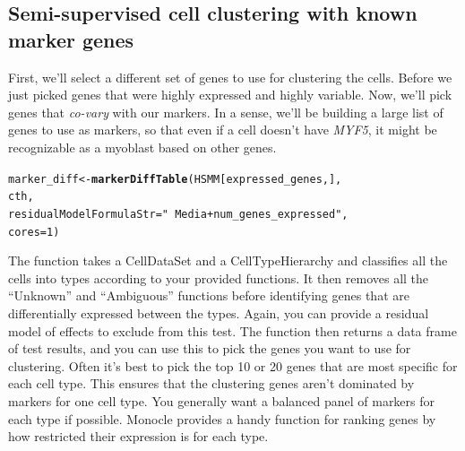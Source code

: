 \documentclass[10pt,oneside]{article}\usepackage[]{graphicx}\usepackage[]{color}
\makeatletter
\newcommand{\hlnum}[1]{\textcolor[rgb]{0.686,0.059,0.569}{#1}}%
\newcommand{\hlstr}[1]{\textcolor[rgb]{0.192,0.494,0.8}{#1}}%
\newcommand{\hlstd}[1]{\textcolor[rgb]{0.345,0.345,0.345}{#1}}%
\newcommand{\hlkwb}[1]{\textcolor[rgb]{0.69,0.353,0.396}{#1}}%
\newcommand{\hlkwc}[1]{\textcolor[rgb]{0.333,0.667,0.333}{#1}}%
\newcommand{\hlkwd}[1]{\textcolor[rgb]{0.737,0.353,0.396}{\textbf{#1}}}%
\newenvironment{kframe}{%
 \def\at@end@of@kframe{}%
 \ifinner\ifhmode%
  \def\at@end@of@kframe{\end{minipage}}%
  \begin{minipage}{\columnwidth}%
 \fi\fi%
 \def\FrameCommand##1{\hskip\@totalleftmargin \hskip-\fboxsep
 \colorbox{shadecolor}{##1}\hskip-\fboxsep
     \hskip-\linewidth \hskip-\@totalleftmargin \hskip\columnwidth}%
 \MakeFramed {\advance\hsize-\width
   \@totalleftmargin\z@ \linewidth\hsize
   \@setminipage}}%
 {\par\unskip\endMakeFramed%
 \at@end@of@kframe}
\newenvironment{knitrout}{}{} %
\makeatother
\begin{document}
\subsection{Semi-supervised cell clustering with known marker genes}
  
First, we'll select a different set of genes to use for clustering the cells. Before we just picked genes that were highly expressed and highly variable. Now, we'll pick genes that \emph{co-vary} with our markers. In a sense, we'll be building a large list of genes to use as markers, so that even if a cell doesn't have \emph{MYF5}, it might be recognizable as a myoblast based on other genes.
  
\begin{knitrout}
\color{fgcolor}\begin{kframe}
\begin{alltt}
\hlstd{marker_diff} \hlkwb{<-} \hlkwd{markerDiffTable}\hlstd{(HSMM[expressed_genes,],}
                                 \hlstd{cth,}
                                 \hlkwc{residualModelFormulaStr}\hlstd{=}\hlstr{"~Media + num_genes_expressed"}\hlstd{,}
                                 \hlkwc{cores}\hlstd{=}\hlnum{1}\hlstd{)}
\end{alltt}
\end{kframe}
\end{knitrout}
The function  takes a CellDataSet and a CellTypeHierarchy and classifies all the cells into types according to your provided functions. It then removes all the ``Unknown'' and ``Ambiguous'' functions before identifying genes that are differentially expressed between the types. Again, you can provide a residual model of effects to exclude from this test. The function then returns a data frame of test results, and you can use this to pick the genes you want to use for clustering. Often it's best to pick the top 10 or 20 genes that are most specific for each cell type. This ensures that the clustering genes aren't dominated by markers for one cell type. You generally want a balanced panel of markers for each type if possible. Monocle provides a handy function for ranking genes by how restricted their expression is for each type.  
\end{document}
